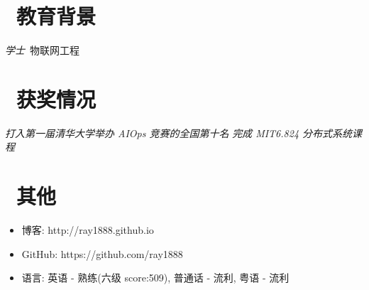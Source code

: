 \documentclass{resume}
\begin{document}
\section{\faGraduationCap\  教育背景}
\textit{学士}\ 物联网工程

\section{\faHeartO\ 获奖情况}
\textit{打入第一届清华大学举办 AIOps 竞赛的全国第十名}
\textit{完成 MIT6.824 分布式系统课程}

\section{\faInfo\ 其他}
\begin{itemize}[parsep=0.5ex]
    \item 博客: http://ray1888.github.io 
    \item GitHub: https://github.com/ray1888
    \item 语言: 英语 - 熟练(六级 score:509), 普通话 - 流利, 粤语 - 流利
\end{itemize}

%
%
\end{document}
